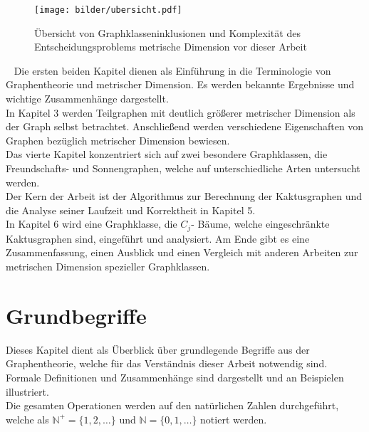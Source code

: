 \vspace{-3mm}
\newline
\begin{figure}[h]
\centering
\texttt{[image: bilder/ubersicht.pdf]}
\caption{Übersicht von Graphklasseninklusionen und Komplexität des Entscheidungsproblems metrische Dimension vor dieser Arbeit}
\end{figure}
\vspace{-2mm}
~\linebreak
Die ersten beiden Kapitel dienen als Einführung in die Terminologie von Graphentheorie und metrischer Dimension. Es werden bekannte Ergebnisse und wichtige Zusammenhänge dargestellt.\\In Kapitel 3 werden Teilgraphen mit deutlich größerer metrischer Dimension als der Graph selbst betrachtet. Anschließend werden verschiedene Eigenschaften von Graphen bezüglich metrischer Dimension bewiesen.\\ 
Das vierte Kapitel konzentriert sich auf zwei besondere Graphklassen, die Freundschafts- und Sonnengraphen, welche auf unterschiedliche Arten untersucht werden.\\Der Kern der Arbeit ist der Algorithmus zur Berechnung der Kaktusgraphen und die Analyse seiner Laufzeit und Korrektheit in Kapitel 5.\\In Kapitel 6 wird eine Graphklasse, die $C_j$- Bäume, welche eingeschränkte Kaktusgraphen sind, eingeführt und analysiert. Am Ende gibt es eine Zusammenfassung, einen Ausblick und einen Vergleich mit anderen Arbeiten zur metrischen Dimension spezieller Graphklassen.
\chapter{Grundbegriffe}
\vspace{-4mm}
Dieses Kapitel dient als Überblick über grundlegende Begriffe aus der Graphentheorie, welche für das Verständnis dieser Arbeit notwendig sind. Formale Definitionen und Zusammenhänge sind dargestellt und an Beispielen illustriert.%
\\
Die gesamten Operationen werden auf den natürlichen Zahlen durchgeführt, welche als $\mathbb{N}^+=\{1,2,\ldots\}$ und $\mathbb{N}=\{0,1,\ldots\}$ notiert werden.
\vspace{-2mm}
